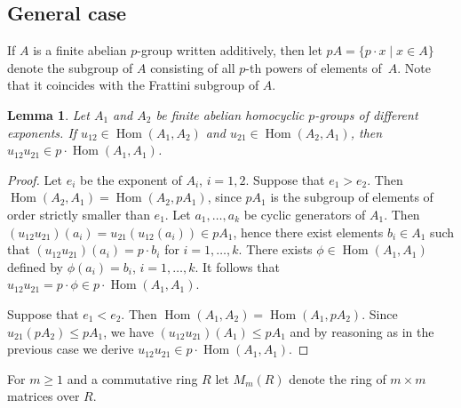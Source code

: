 \documentclass{article}
\newtheorem{lemma}[theorem]{Lemma}
\DeclareMathOperator{\Hom}{Hom}
\begin{document}
\subsection{General case}

If \( A \) is a finite abelian \( p \)-group written additively, then let \( pA = \{ p \cdot x \mid x \in A \} \)
denote the subgroup of \( A \) consisting of all \( p \)-th powers of elements of~\( A \). Note that it coincides with the Frattini subgroup of \( A \).

\begin{lemma}\label{twohomo}
	Let \( A_1 \) and \( A_2 \) be finite abelian homocyclic \( p \)-groups of different exponents.
	If \( u_{12} \in \Hom(A_1, A_2) \) and \( u_{21} \in \Hom(A_2, A_1) \), then \( u_{12}u_{21} \in p \cdot \Hom(A_1, A_1) \).
\end{lemma}
\begin{proof}
	Let \( e_i \) be the exponent of \( A_i \), \( i = 1, 2 \).
	Suppose that \( e_1 > e_2 \). Then \( \Hom(A_2, A_1) = \Hom(A_2, pA_1) \), since \( pA_1 \) is the subgroup of elements of order strictly smaller than \( e_1 \).
	Let \( a_1, \dots, a_k \) be cyclic generators of \( A_1 \).
	Then \( (u_{12}u_{21})(a_i) = u_{21}(u_{12}(a_i)) \in pA_1 \),
	hence there exist elements \( b_i \in A_1 \) such that \( (u_{12}u_{21})(a_i) = p\cdot b_i \) for \( i = 1, \dots, k \).
	There exists \( \phi \in \Hom(A_1, A_1) \) defined by \( \phi(a_i) = b_i \), \( i = 1, \dots, k \).
	It follows that \( u_{12}u_{21} = p \cdot \phi \in p \cdot \Hom(A_1, A_1) \).

	Suppose that \( e_1 < e_2 \). Then \( \Hom(A_1, A_2) = \Hom(A_1, pA_2) \).
	Since \( u_{21}(pA_2) \leq pA_1 \), we have \( (u_{12}u_{21})(A_1) \leq pA_1 \)
	and by reasoning as in the previous case we derive \( u_{12}u_{21} \in p \cdot \Hom(A_1, A_1) \).
\end{proof}

For \( m \geq 1 \) and a commutative ring \( R \) let \( M_m(R) \) denote the ring of \( m \times m \) matrices over \( R \).
\end{document}
